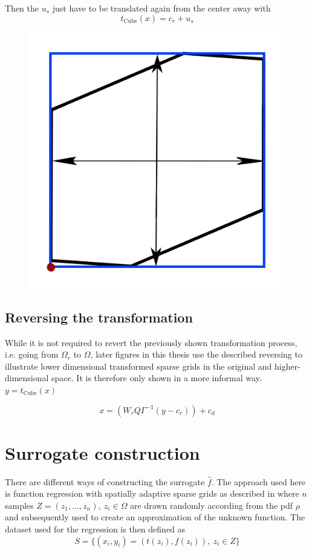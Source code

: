 \documentclass[
  a4paper,  %
  twoside,  %
  bibliography=totoc,
  headsepline,
  cleardoublepage=empty,
  parskip=half,
  draft=false
]{scrbook}
\begin{document}
Then the $u_s$ just have to be translated again from the center away with
\begin{equation}
t_{\text{Cube}}(x)=c_r + u_s
\end{equation}

\begin{figure}[H]
\centering
  \includegraphics[width=0.4\linewidth]{graphics/s_unit}
  \label{fig:f2_combined_rel_errors_inter}
\end{figure}


\section{Reversing the transformation}

While it is not required to revert the previously shown transformation process, i.e. going from $\Omega_r$ to $\Omega$, later figures in this thesis use the described reversing to illustrate lower dimensional transformed sparse grids in the original and higher-dimensional space.
It is therefore only shown in a more informal way.
$y=t_{\text{Cube}}(x)$

\begin{equation}
x=(W_r Q \Gamma^{-1} (y - c_r)) + c_d
\end{equation}

\chapter{Surrogate construction}

There are different ways of constructing the surrogate $\hat{f}$.
The approach used here is function regression with spatially adaptive sparse grids as described in \cite{P10} where $n$ samples $Z=(z_1,\dots,z_n), ~ z_i \in \Omega$ are drawn randomly according from the pdf $\rho$ and subsequently used to create an approximation of the unknown function.
The dataset used for the regression is then defined as
\begin{equation}
S=\{(x_i,y_i) = (t(z_i),f(z_i)), ~ z_i \in Z\}
\end{equation}
\end{document}
